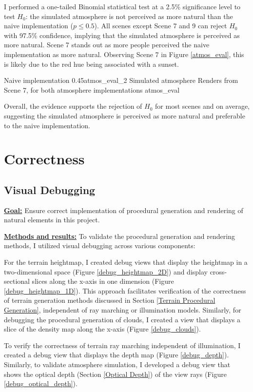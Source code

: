 I performed a one-tailed Binomial statistical test at a 2.5\% significance level to test $H_0$: the simulated atmosphere is not perceived as more natural than the naive implementation ($p \le 0.5$). All scenes except Scene 7 and 9 can reject $H_0$ with 97.5\% confidence, implying that the simulated atmosphere is perceived as more natural. Scene 7 stands out as more people perceived the naive implementation as more natural. Observing Scene 7 in Figure \ref{atmos_eval}, this is likely due to the red hue being associated with a sunset.

{Naive implementation}
{0.45}{atmos_eval_2}
{Simulated atmosphere}
{Renders from Scene 7, for both atmosphere implementations}
{atmos_eval}

Overall, the evidence supports the rejection of $H_0$ for most scenes and on average, suggesting the simulated atmosphere is perceived as more natural and preferable to the naive implementation.


\section{Correctness}
\label{Correctness}

\subsection{Visual Debugging}
\label{Visual Debugging}

\textbf{\underline{Goal:}}
Ensure correct implementation of procedural generation and rendering of natural elements in this project.

\textbf{\underline{Methods and results:}}
To validate the procedural generation and rendering methods, I utilized visual debugging across various components:

For the terrain heightmap, I created debug views that display the heightmap in a two-dimensional space (Figure \ref{debug_heightmap_2D}) and display cross-sectional slices along the x-axis in one dimension (Figure \ref{debug_heightmap_1D}). This approach facilitates verification of the correctness of terrain generation methods discussed in Section \ref{Terrain Procedural Generation}, independent of ray marching or illumination models. Similarly, for debugging the procedural generation of clouds, I created a view that displays a slice of the density map along the x-axis (Figure \ref{debug_clouds}).

To verify the correctness of terrain ray marching independent of illumination, I created a debug view that displays the depth map (Figure \ref{debug_depth}). Similarly, to validate atmosphere simulation, I developed a debug view that shows the optical depth (Section \ref{Optical Depth}) of the view rays (Figure \ref{debug_optical_depth}).

